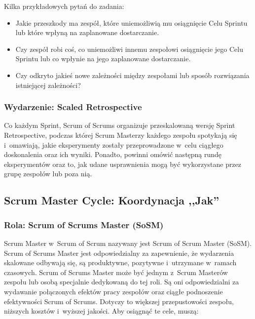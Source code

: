 \documentclass[12pt,a4paper,parskip=full]{scrartcl}
\begin{document}
Kilka przykładowych pytań do zadania:

\begin{itemize}
\itemsep1pt\parskip0pt
\item
  Jakie przeszkody ma zespół, które uniemożliwią mu osiągnięcie Celu Sprintu lub które wpłyną na zaplanowane dostarczanie.
\item
  Czy zespół robi coś, co uniemożliwi innemu zespołowi osiągnięcie jego Celu Sprintu lub co wpłynie na jego zaplanowane dostarczanie.
\item
  Czy odkryto jakieś nowe zależności między zespołami lub sposób rozwiązania istniejącej zależności?
\end{itemize}

\subsubsection{Wydarzenie: Scaled Retrospective}\label{event-the-scaled-retrospective}

Co każdym Sprint, Scrum of Scrums organizuje przeskalowaną wersję Sprint Retrospective, podczas której Scrum Masterzy każdego zespołu spotykają się i~omawiają, jakie eksperymenty zostały przeprowadzone w~celu ciągłego doskonalenia oraz ich wyniki. Ponadto, powinni omówić następną rundę eksperymentów oraz to, jak udane usprawnienia mogą być wykorzystane przez grupę zespołów lub poza nią.

\subsection{Scrum Master Cycle: Koordynacja ,,Jak''}\label{the-scrum-master-cycle}

\subsubsection{Rola: Scrum of Scrums Master (SoSM)}\label{role-the-scrum-of-scrums-master}
Scrum Master w~Scrum of Scrum nazywany jest Scrum of Scrum Master (SoSM). Scrum of Scrums Master jest odpowiedzialny za zapewnienie, że wydarzenia skalowane odbywają się, są produktywne, pozytywne i~utrzymane w~ramach czasowych. Scrum of Scrums Master może być jednym z~Scrum Masterów zespołu lub osobą specjalnie dedykowaną do tej roli. Są oni odpowiedzialni za wydawanie połączonych efektów pracy zespołów oraz ciągłe podnoszenie efektywności Scrum of Scrums. Dotyczy to większej przepustowości zespołu, niższych kosztów i~wyższej jakości. Aby osiągnąć te cele, muszą:
\end{document}
